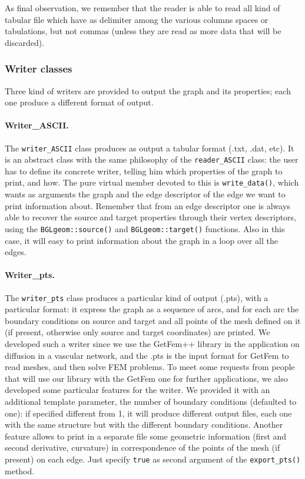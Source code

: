 \documentclass[10pt]{article} %
\begin{document}
	As final observation, we remember that the reader is able to read all kind of tabular file which have as delimiter among the various columns spaces or tabulations, but not commas (unless they are read as more data that will be discarded).
	
	\subsubsection{Writer classes}
	Three kind of writers are provided to output the graph and its properties; each one produce a different format of output.
	\paragraph{Writer\_ASCII.} The \texttt{writer\_ASCII} class produces as output a tabular format (.txt, .dat, etc). It is an abstract class with the same philosophy of the \texttt{reader\_ASCII} class: the user has to define its concrete writer, telling him which properties of the graph to print, and how. The pure virtual member devoted to this is \texttt{write\_data()}, which wants as arguments the graph and the edge descriptor of the edge we want to print information about. Remember that from an edge descriptor one is always able to recover the source and target properties through their vertex descriptors, using the \texttt{BGLgeom::source()} and \texttt{BGLgeom::target()} functions. Also in this case, it will easy to print information about the graph in a loop over all the edges.
	\paragraph{Writer\_pts.} The \texttt{writer\_pts} class produces a particular kind of output (.pts), with a particular format: it express the graph as a sequence of arcs, and for each arc the boundary conditions on source and target and all points of the mesh defined on it (if present, otherwise only source and target coordinates) are printed. We developed such a writer since we use the GetFem++ library in the application on diffusion in a vascular network, and the .pts is the input format for GetFem to read meshes, and then solve FEM problems. \newline
	To meet some requests from people that will use our library with the GetFem one for further applications, we also developed some particular features for the writer. We provided it with an additional template parameter, the number of boundary conditions (defaulted to one): if specified different from 1, it will produce different output files, each one with the same structure but with the different boundary conditions. Another feature allows to print in a separate file some geometric information (first and second derivative, curvature) in correspondence of the points of the mesh (if present) on each edge. Just specify \texttt{true} as second argument of the \texttt{export\_pts()} method.
\end{document}
